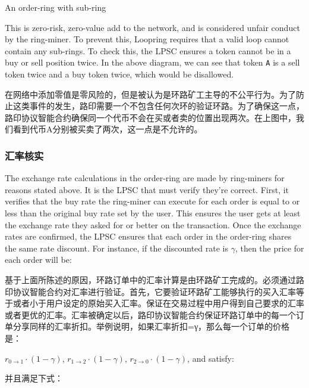\documentclass[UTF8,nofonts]{ctexart}
\makeatletter
\newenvironment{figurehere}
 {\def\@captype{figure}}
 {}
\makeatother
\begin{document}
\begin{multicols}{2}
\begin{center}
\begin{figurehere}
\begin{tikzpicture}
\end{tikzpicture}

\caption{An order-ring with sub-ring}
\label{fig:subring}
\end{figurehere}
\end{center}

This is zero-risk, zero-value add to the network, and is considered unfair conduct by the ring-miner. To prevent this, Loopring requires that a valid loop cannot contain any sub-rings. To check this, the LPSC ensures a token cannot be in a buy or sell position twice. In the above diagram, we can see that token \verb|A| is a sell token twice and a buy token twice, which would be disallowed. 

在网络中添加零值是零风险的，但是被认为是环路矿工主导的不公平行为。为了防止这类事件的发生，路印需要一个不包含任何次环的验证环路。为了确保这一点，路印协议智能合约确保同一个代币不会在买或者卖的位置出现两次。在上图中，我们看到代币A分别被买卖了两次，这一点是不允许的。


\subsubsection{汇率核实\label{sec:fill_rate_check}}


The exchange rate calculations in the order-ring are made by ring-miners for reasons stated above. It is the LPSC that must verify they're correct. First, it verifies that the buy rate the ring-miner can execute for each order is equal to or less than the original buy rate set by the user. This ensures the user gets at least the exchange rate they asked for or better on the transaction. Once the exchange rates are confirmed, the LPSC ensures that each order in the order-ring shares the same rate discount. For instance, if the discounted rate is $\gamma$, then the price for each order will be:

基于上面所陈述的原因，环路订单中的汇率计算是由环路矿工完成的。必须通过路印协议智能合约对汇率进行验证。首先，它要验证环路矿工能够执行的买入汇率等于或者小于用户设定的原始买入汇率。保证在交易过程中用户得到自己要求的汇率或者更优的汇率。汇率被确定以后，路印协议智能合约保证环路订单中的每一个订单分享同样的汇率折扣。举例说明，如果汇率折扣=γ，那么每一个订单的价格是：


$r_{0\rightarrow 1} \cdot (1-\gamma)$, $r_{1\rightarrow 2} \cdot (1-\gamma)$, $r_{2 \rightarrow 0} \cdot (1-\gamma)$, and satisfy: 

并且满足下式：




\end{multicols}
\end{document}
